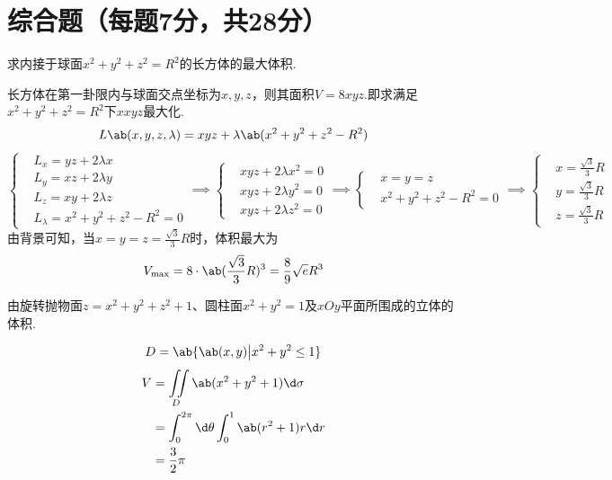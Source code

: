 \section{综合题（每题7分，共28分）}
\begin{exercise}
    求内接于球面$x^2+y^2+z^2=R^2$的长方体的最大体积.
\end{exercise}
\begin{solution}
    长方体在第一卦限内与球面交点坐标为$x,y,z$，则其面积$V=8xyz$.即求满足$x^2+y^2+z^2=R^2$下$xxyz$最大化.
    $$L\ab(x,y,z,\lambda)=xyz+\lambda\ab(x^2+y^2+z^2-R^2)$$
    $$
    \left\{
        \begin{aligned}
            &L_x=yz+2\lambda x\\
            &L_y=xz+2\lambda y\\
            &L_z=xy+2\lambda z\\
            &L_{\lambda}=x^2+y^2+z^2-R^2=0
        \end{aligned}
    \right.\implies\left\{
    \begin{aligned}
        &xyz+2\lambda x^2=0\\
        &xyz+2\lambda y^2=0\\
        &xyz+2\lambda z^2=0
    \end{aligned}\right.\implies\left\{
    \begin{aligned}
        &x=y=z\\
        &x^2+y^2+z^2-R^2=0
    \end{aligned}
    \right.\implies\left\{
        \begin{aligned}
            &x=\frac{\sqrt{3}}{3}R\\
            &y=\frac{\sqrt{3}}{3}R\\
            &z=\frac{\sqrt{3}}{3}R
        \end{aligned}
    \right.
    $$
    由背景可知，当$x=y=z=\frac{\sqrt{3}}{3}R$时，体积最大为
    $$V_{\max}=8\cdot\ab(\frac{\sqrt{3}}{3}R)^3=\frac{8}{9}\sqrt{e}R^3$$
\end{solution}

\begin{exercise}
    由旋转抛物面$z=x^2+y^2+z^2+1$、圆柱面$x^2+y^2=1$及$xOy$平面所围成的立体的体积.
\end{exercise}
\begin{solution}
    $$D=\ab{\ab(x,y)\big|x^2+y^2\le 1}$$
    $$
    \begin{aligned}
    V&=\iint\limits_D{\ab(x^2+y^2+1)\d\sigma}\\
    &=\int_0^{2\pi}{\d\theta}\int_0^1{\ab(r^2+1)r\d r}\\
    &=\frac{3}{2}\pi
    \end{aligned}
    $$
\end{solution}

